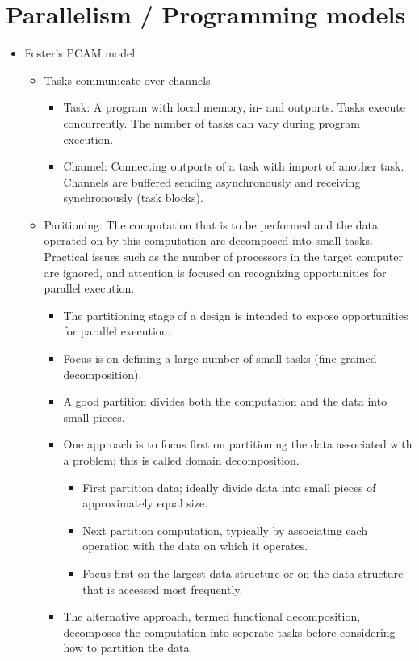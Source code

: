 \documentclass[paper=a4, fontsize=11pt]{scrartcl} %
\numberwithin{equation}{section} %
\numberwithin{figure}{section} %
\numberwithin{table}{section} %
\begin{document}
\section{Parallelism / Programming models}

\begin{itemize}
  \item Foster's PCAM model
  \begin{itemize}
    \item Tasks communicate over channels
    \begin{itemize}
      \item Task: A program with local memory, in- and outports. Tasks execute concurrently. The number of tasks can vary during program execution.
      \item Channel: Connecting outports of a task with import of another task. Channels are buffered sending asynchronously and receiving synchronously (task blocks).
    \end{itemize}
    \item Paritioning: The computation that is to be performed and the data operated on by this computation are decomposed into small tasks. Practical issues such as the number of processors in the target computer are ignored, and attention is focused on recognizing opportunities for parallel execution.
    \begin{itemize}
      \item The partitioning stage of a design is intended to expose opportunities for parallel execution.
      \item Focus is on defining a large number of small tasks (fine-grained decomposition).
      \item A good partition divides both the computation and the data into small pieces.
      \item One approach is to focus first on partitioning the data associated with a problem; this is called domain decomposition.
      \begin{itemize}
        \item First partition data; ideally divide data into small pieces of approximately equal size.
        \item Next partition computation, typically by associating each operation with the data on which it operates.
        \item Focus first on the largest data structure or on the data structure that is accessed most frequently.
      \end{itemize}
      \item The alternative approach, termed functional decomposition, decomposes the computation into seperate tasks before considering how to partition the data.

\end{itemize}
\end{itemize}
\end{itemize}
\end{document}
